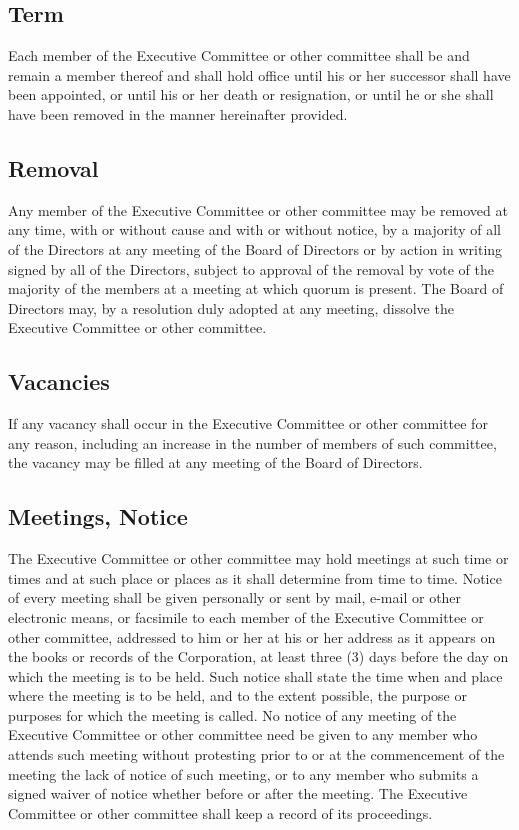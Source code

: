 \documentclass{article}
\begin{document}
\subsection{Term}
Each member of the Executive Committee or other committee shall be and remain a member thereof and shall hold office until his or her successor shall have been appointed, or until his or her death or resignation, or until he or she shall have been removed in the manner hereinafter provided.
\subsection{Removal}
Any member of the Executive Committee or other committee may be removed at any time, with or without cause and with or without notice, by a majority of all of the Directors at any meeting of the Board of Directors or by action in writing signed by all of the Directors, subject to approval of the removal by vote of the majority of the members at a meeting at which quorum is present.  The Board of Directors may, by a resolution duly adopted at any meeting, dissolve the Executive Committee or other committee.
\subsection{Vacancies}
If any vacancy shall occur in the Executive Committee or other committee for any reason, including an increase in the number of members of such committee, the vacancy may be filled at any meeting of the Board of Directors.
\subsection{Meetings, Notice}
The Executive Committee or other committee may hold meetings at such time or times and at such place or places as it shall determine from time to time.  Notice of every meeting shall be given personally or sent by mail, e-mail or other electronic means, or facsimile to each member of the Executive Committee or other committee, addressed to him or her at his or her address as it appears on the books or records of the Corporation, at least three (3) days before the day on which the meeting is to be held.  Such notice shall state the time when and place where the meeting is to be held, and to the extent possible, the purpose or purposes for which the meeting is called.  No notice of any meeting of the Executive Committee or other committee need be given to any member who attends such meeting without protesting prior to or at the commencement of the meeting the lack of notice of such meeting, or to any member who submits a signed waiver of notice whether before or after the meeting.  The Executive Committee or other committee shall keep a record of its proceedings.
\end{document}
